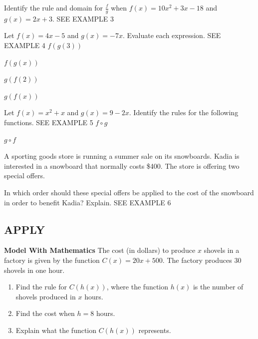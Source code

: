 \documentclass{article}
\newenvironment{practice}[2]{}{}
\newcommand{\placeholder}[2]{}
\begin{document}
\begin{practice}{23}{}
Identify the rule and domain for $\frac{f}{g}$ when $f(x) = 10x^2 + 3x - 18$ and $g(x) = 2x + 3$. \textsc{SEE EXAMPLE 3}
\end{practice}

Let $f(x) = 4x - 5$ and $g(x) = -7x$. Evaluate each expression. \textsc{SEE EXAMPLE 4}
\begin{practice}{24}{}
$f(g(3))$
\end{practice}

\begin{practice}{25}{}
$f(g(x))$
\end{practice}

\begin{practice}{26}{}
$g(f(2))$
\end{practice}

\begin{practice}{27}{}
$g(f(x))$
\end{practice}

Let $f(x) = x^2 + x$ and $g(x) = 9 - 2x$. Identify the rules for the following functions. \textsc{SEE EXAMPLE 5}
\begin{practice}{28}{}
$f \circ g$
\end{practice}

\begin{practice}{29}{}
$g \circ f$
\end{practice}

\begin{practice}{30}{}
A sporting goods store is running a summer sale on its snowboards. Kadia is interested in a snowboard that normally costs \$400. The store is offering two special offers.

In which order should these special offers be applied to the cost of the snowboard in order to benefit Kadia? Explain. \textsc{SEE EXAMPLE 6}

\placeholder{illustration}{Snowboards on display in a store, with two circular stickers indicating offers: "\$50 INSTANT REBATE" and "10\% DISCOUNT".}
\end{practice}

\subsection*{APPLY}

\begin{practice}{31}{}
\textbf{Model With Mathematics} The cost (in dollars) to produce $x$ shovels in a factory is given by the function $C(x) = 20x + 500$. The factory produces 30 shovels in one hour.
\begin{enumerate}
\item[\textbf{a.}] Find the rule for $C(h(x))$, where the function $h(x)$ is the number of shovels produced in $x$ hours.
\item[\textbf{b.}] Find the cost when $h = 8$ hours.
\item[\textbf{c.}] Explain what the function $C(h(x))$ represents.
\end{enumerate}
\end{practice}
\end{document}
